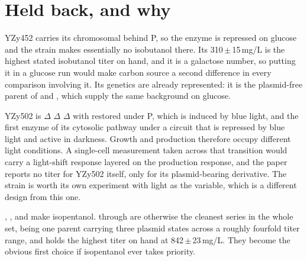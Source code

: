 
\section{Held back, and why}\label{sec:held}



YZy452 carries its chromosomal  behind P, so the
enzyme is repressed on glucose and the strain makes essentially no isobutanol
there. Its 310\,$\pm$\,15\,mg/L is the highest stated isobutanol titer on hand,
and it is a galactose number, so putting it in a glucose run would make carbon
source a second difference in every comparison involving it. Its genetics are
already represented: it is the plasmid-free parent of  and
, which supply the same background on glucose.

YZy502 is $\Delta$ $\Delta$ $\Delta$ with
 restored under P, which is induced by blue light, and the
first enzyme of its cytosolic pathway under a circuit that is repressed by blue
light and active in darkness. Growth and production therefore occupy different
light conditions. A single-cell measurement taken across that transition would
carry a light-shift response layered on the production response, and the paper
reports no titer for YZy502 itself, only for its plasmid-bearing derivative. The
strain is worth its own experiment with light as the variable, which is a
different design from this one.

, ,  and  make isopentanol.
 through  are otherwise the cleanest series in the
whole set, being one parent carrying three plasmid states across a roughly
fourfold titer range, and  holds the highest titer on hand at
842\,$\pm$\,23\,mg/L. They become the obvious first choice if isopentanol ever
takes priority.
